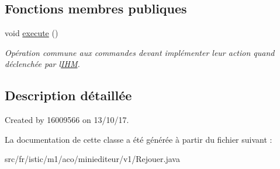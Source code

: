 \subsection*{Fonctions membres publiques}
\begin{DoxyCompactItemize}
\item 
\mbox{\label{classfr_1_1istic_1_1m1_1_1aco_1_1miniediteur_1_1v1_1_1Rejouer_a4c2093ae315b9520fa94a1f058a4d815}} 
void \hyperlink{classfr_1_1istic_1_1m1_1_1aco_1_1miniediteur_1_1v1_1_1Rejouer_a4c2093ae315b9520fa94a1f058a4d815}{execute} ()
\begin{DoxyCompactList}\small\item\em Opération commune aux commandes devant implémenter leur action quand déclenchée par l\textquotesingle{}\hyperlink{interfacefr_1_1istic_1_1m1_1_1aco_1_1miniediteur_1_1v1_1_1IHM}{I\+HM}. \end{DoxyCompactList}\end{DoxyCompactItemize}


\subsection{Description détaillée}
Created by 16009566 on 13/10/17. 

La documentation de cette classe a été générée à partir du fichier suivant \+:\begin{DoxyCompactItemize}
\item 
src/fr/istic/m1/aco/miniediteur/v1/Rejouer.\+java\end{DoxyCompactItemize}
